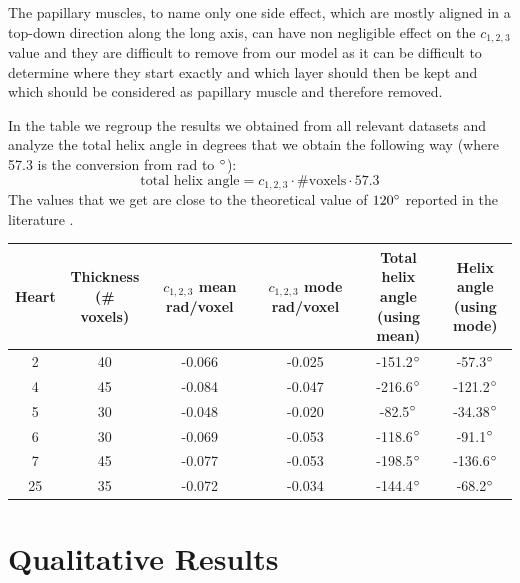 The papillary muscles, to name only one side effect, which are mostly aligned in a top-down direction along the long axis, can have non negligible effect on the $c_{1,2,3}$ value and they are difficult to remove from our model as it can be difficult to determine where they start exactly and which layer should then be kept and which should be considered as papillary muscle and therefore removed.

In the table we regroup the results we obtained from all relevant datasets and analyze the total helix angle in degrees that we obtain the following way (where 57.3 is the conversion from rad to $^{\circ}$):
\begin{equation}
    \text{total helix angle} = c_{1,2,3}\cdot \text{\#voxels}\cdot 57.3
\end{equation}
The values that we get are close to the theoretical value of $120^{\circ}$ reported in the literature \cite{piuzephd}.

\begin{center}
    \begin{tabular}{|c | c | c | c| c| c|} 
         \hline
         Heart & \shortstack{Thickness \\ (\# voxels)} & \shortstack{$c_{1,2,3}$ mean \\ rad/voxel} & \shortstack{$c_{1,2,3}$ mode \\ rad/voxel} & \shortstack{Total helix angle \\ (using mean)} & \shortstack{Helix angle \\ (using mode)}\\
         \hline
         2 & 40 & -0.066 & -0.025 & -151.2$^{\circ}$ & -57.3$^{\circ}$ \\ 
         \hline
         4 & 45 & -0.084 & -0.047 & -216.6$^{\circ}$ & -121.2$^{\circ}$ \\
         \hline
         5 & 30 & -0.048 & -0.020 & -82.5$^{\circ}$ & -34.38$^{\circ}$ \\
         \hline
         6 & 30 & -0.069 & -0.053 & -118.6$^{\circ}$ & -91.1$^{\circ}$ \\
         \hline
         7 & 45 & -0.077 & -0.053 & -198.5$^{\circ}$ & -136.6$^{\circ}$ \\ 
         \hline
         25 & 35 & -0.072 & -0.034 & -144.4$^{\circ}$ & -68.2$^{\circ}$ \\
         \hline
    \end{tabular}
\end{center}


\section{Qualitative Results}

